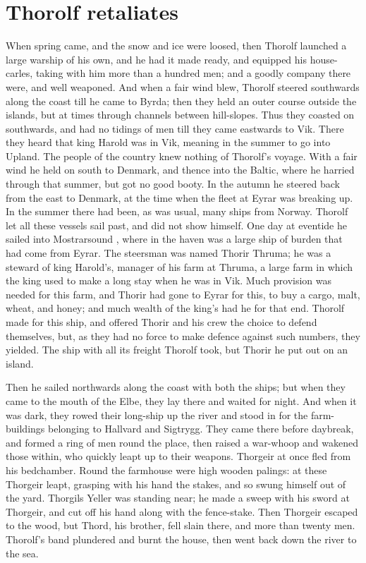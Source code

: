 \chapter{Thorolf retaliates}
When spring came, and the snow and ice were loosed, then Thorolf launched a large warship of his own, and he had it made ready, and equipped his house-carles, taking with him more than a hundred men; and a goodly company there were, and well weaponed. And when a fair wind blew, Thorolf steered southwards along the coast till he came to Byrda; then they held an outer course outside the islands, but at times through channels between hill-slopes. Thus they coasted on southwards, and had no tidings of men till they came eastwards to Vik. There they heard that king Harold was in Vik, meaning in the summer to go into Upland. The people of the country knew nothing of Thorolf's voyage. With a fair wind he held on south to Denmark, and thence into the Baltic, where he harried through that summer, but got no good booty. In the autumn he steered back from the east to Denmark, at the time when the fleet at Eyrar was breaking up. In the summer there had been, as was usual, many ships from Norway. Thorolf let all these vessels sail past, and did not show himself. One day at eventide he sailed into Mostrarsound , where in the haven was a large ship of burden that had come from Eyrar. The steersman was named Thorir Thruma; he was a steward of king Harold's, manager of his farm at Thruma, a large farm in which the king used to make a long stay when he was in Vik. Much provision was needed for this farm, and Thorir had gone to Eyrar for this, to buy a cargo, malt, wheat, and honey; and much wealth of the king's had he for that end. Thorolf made for this ship, and offered Thorir and his crew the choice to defend themselves, but, as they had no force to make defence against such numbers, they yielded. The ship with all its freight Thorolf took, but Thorir he put out on an island.

Then he sailed northwards along the coast with both the ships; but when they came to the mouth of the Elbe, they lay there and waited for night. And when it was dark, they rowed their long-ship up the river and stood in for the farm-buildings belonging to Hallvard and Sigtrygg. They came there before daybreak, and formed a ring of men round the place, then raised a war-whoop and wakened those within, who quickly leapt up to their weapons. Thorgeir at once fled from his bedchamber. Round the farmhouse were high wooden palings: at these Thorgeir leapt, grasping with his hand the stakes, and so swung himself out of the yard. Thorgils Yeller was standing near; he made a sweep with his sword at Thorgeir, and cut off his hand along with the fence-stake. Then Thorgeir escaped to the wood, but Thord, his brother, fell slain there, and more than twenty men. Thorolf's band plundered and burnt the house, then went back down the river to the sea.

